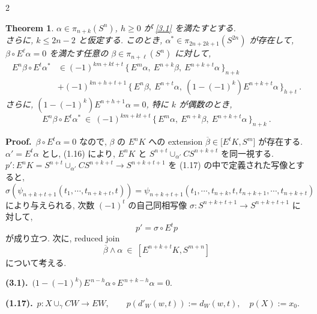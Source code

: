 \documentclass[10pt, leqno]{ltjsarticle}
\newcommand{\Ex}{E}        %
\newcommand{\todai}[2][]{\{\,#2\,\}_{#1}}      %
\newcommand{\hs}[2]{\bigl[#1,#2\bigr]}   %
\newcommand{\pis}[2]{\pi_{#1}(#2)}       %
\newcommand{\ext}[1]{\overline{#1}}     %
\numberwithin{equation}{section}
\theoremstyle{plain}
\newtheorem{theorem}{Theorem}[section]
\theoremstyle{definition}
\theoremstyle{remark}
\begin{document}
\begin{paracol}{2}

\begin{theorem}\label{thm:3.6}
$\alpha\in\pis{n+k}{S^{n}}$, $h\ge0$ が \eqref{3.1} を満たすとする.\\ 
さらに, $k\le 2n-2$ と仮定する.
このとき,
\(\alpha^{*}\in\pis{2n+2k+1}{S^{2n}}\)
が存在して, \\
\(\beta\circ \Ex^{\ell}\alpha=0\)
を満たす任意の $\beta\in\pis{n+\ell}{S^{n}}$ に対して, 
\[
\begin{align*}
  \Ex^{n}\beta \circ \Ex^{t}\alpha^{*} 
  & \in (-1)^{km+kt+t}\,\todai[n+k]{\Ex^{m}\alpha,\ 
  \Ex^{n+k}\beta,\ \Ex^{n+k+t}\alpha}\\
  & + (-1)^{kn+h+t+1}\,\todai[h+t]{\Ex^{n}\beta,\ 
  \Ex^{n+t}\alpha,\ (1-(-1)^k)\Ex^{n+k+t}\alpha}\ .
\end{align*}
\]
さらに,
\((1-(-1)^k)\Ex^{n+h+1}\alpha=0\), 特に \(k\) が偶数のとき, 
\[
\Ex^{n}\beta\circ \Ex^{t}\alpha^{*}\ \in\
(-1)^{km+kt+t}\,\todai[n+k]{\Ex^{m}\alpha,\ \Ex^{n+k}\beta,\ \Ex^{n+k+t}\alpha}\ .
\]
\end{theorem}

\textbf{Proof.}\ 
$\beta\circ \Ex^{t}\alpha=0$ なので, $\beta$ の $\Ex^{n}K$ への extension
\(\ext{\beta}\in \hs{E^t K}{S^{m}}\)
が存在する. \\
\(\alpha'=\Ex^{t}\alpha\) とし, 
(1.16) により, \(\Ex^{n}K\) と \(S^{n+t}\cup_{\alpha'}CS^{n+k+t}\)
を同一視する. \\
\(p':\Ex^{n}K = S^{n+t}\cup_{\alpha'}CS^{n+k+t} \to S^{n+k+t+1}\)
を (1.17) の中で定義された写像とすると, 
\[
\sigma(\psi_{n+k+t+1}(t_1,\cdots,t_{n+k+t},t))
=\psi_{n+k+t+1}(t_1,\cdots,t_{n+k},t,t_{n+k+1},\cdots,t_{n+k+t})
\]
により与えられる, 次数 \((-1)^{t}\) の自己同相写像
$\sigma:S^{n+k+t+1}\to S^{n+k+t+1}$
に対して, 
\[
p'=\sigma\circ \Ex^{t}p
\]
が成り立つ. 
次に, reduced join 
\[
\ext{\beta} \wedge \alpha\ \in\ [\Ex^{n+k+t}K, S^{m+n}]
\]
について考える. \\

\switchcolumn

\noindent
\textbf{(3.1).}\
\(\bigl(1-(-1)^k\bigr)\, \Ex^{\,n-h}\alpha \circ \Ex^{\,n+k-h}\alpha = 0.\)

\noindent
\textbf{(1.17).}\
\(p:X\cup_\gamma CW\to EW,\qquad
p(d'_W(w, t)) := d_W(w, t),\quad
p(X) := x_0.\)

\end{paracol}
\end{document}
